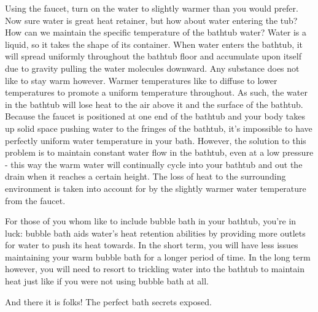 \documentclass[10pt]{article}
\begin{document}
	Using the faucet, turn on the water to slightly warmer than you would prefer. Now sure water is great heat retainer, but how about water entering the tub? How can we maintain the specific temperature of the bathtub water? Water is a liquid, so it takes the shape of its container. When water enters the bathtub, it will spread uniformly throughout the bathtub floor and accumulate upon itself due to gravity pulling the water molecules downward. Any substance does not like to stay warm however. Warmer temperatures like to diffuse to lower temperatures to promote a uniform temperature throughout. As such, the water in the bathtub will lose heat to the air above it and the surface of the bathtub. Because the faucet is positioned at one end of the bathtub and your body takes up solid space pushing water to the fringes of the bathtub, it's impossible to have perfectly uniform water temperature in your bath. However, the solution to this problem is to maintain constant water flow in the bathtub, even at a low pressure - this way the warm water will continually cycle into your bathtub and out the drain when it reaches a certain height. The loss of heat to the surrounding environment is taken into account for by the slightly warmer water temperature from the faucet.
	
	For those of you whom like to include bubble bath in your bathtub, you're in luck: bubble bath aids water's heat retention abilities by providing more outlets for water to push its heat towards. In the short term, you will have less issues maintaining your warm bubble bath for a longer period of time. In the long term however, you will need to resort to trickling water into the bathtub to maintain heat just like if you were not using bubble bath at all.
	
	And there it is folks! The perfect bath secrets exposed. 
	
\end{document}
